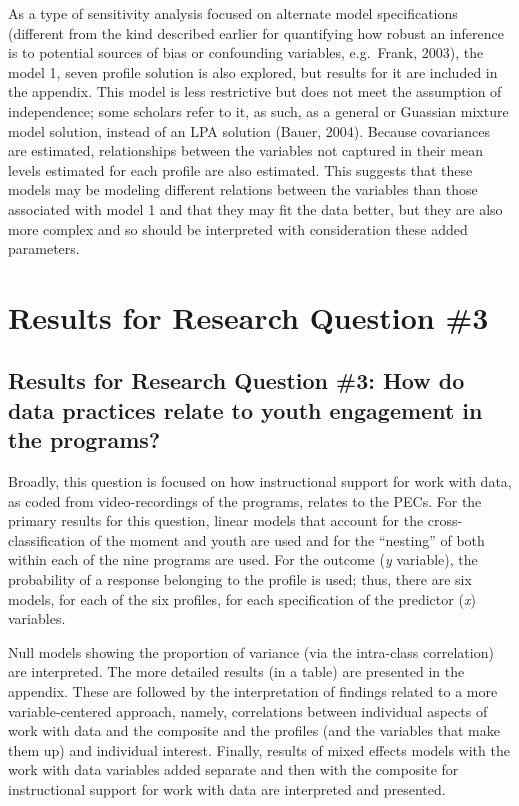 \documentclass[]{msu-thesis}
\theoremstyle{definition}
\theoremstyle{definition}
\theoremstyle{definition}
\theoremstyle{remark}
\begin{document}
As a type of sensitivity analysis focused on alternate model
specifications (different from the kind described earlier for
quantifying how robust an inference is to potential sources of bias or
confounding variables, e.g.~Frank, 2003), the model 1, seven profile
solution is also explored, but results for it are included in the
appendix. This model is less restrictive but does not meet the
assumption of independence; some scholars refer to it, as such, as a
general or Guassian mixture model solution, instead of an LPA solution
(Bauer, 2004). Because covariances are estimated, relationships between
the variables not captured in their mean levels estimated for each
profile are also estimated. This suggests that these models may be
modeling different relations between the variables than those associated
with model 1 and that they may fit the data better, but they are also
more complex and so should be interpreted with consideration these added
parameters.

\chapter{Results for Research Question
\#3}\label{results-for-research-question-3}

\section{Results for Research Question \#3: How do data practices relate
to youth engagement in the
programs?}\label{results-for-research-question-3-how-do-data-practices-relate-to-youth-engagement-in-the-programs}

Broadly, this question is focused on how instructional support for work
with data, as coded from video-recordings of the programs, relates to
the PECs. For the primary results for this question, linear models that
account for the cross-classification of the moment and youth are used
and for the ``nesting'' of both within each of the nine programs are
used. For the outcome (\emph{y} variable), the probability of a response
belonging to the profile is used; thus, there are six models, for each
of the six profiles, for each specification of the predictor (\emph{x})
variables.

Null models showing the proportion of variance (via the intra-class
correlation) are interpreted. The more detailed results (in a table) are
presented in the appendix. These are followed by the interpretation of
findings related to a more variable-centered approach, namely,
correlations between individual aspects of work with data and the
composite and the profiles (and the variables that make them up) and
individual interest. Finally, results of mixed effects models with the
work with data variables added separate and then with the composite for
instructional support for work with data are interpreted and presented.
\end{document}
